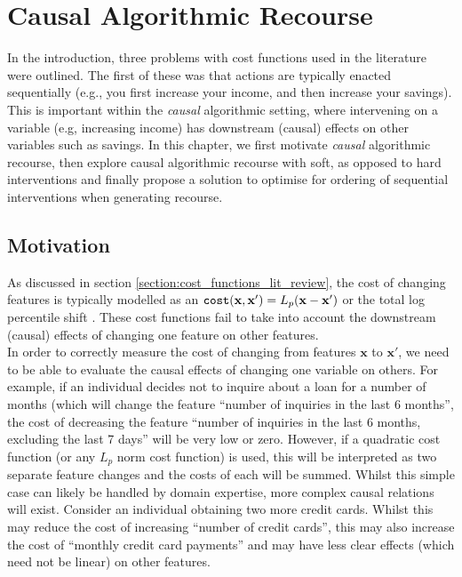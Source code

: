 \chapter{Causal Algorithmic Recourse} \label{chapter:causal_recourse}

In the introduction, three problems with cost functions used in the literature were outlined. The first of these was that actions are typically enacted sequentially (e.g., you first increase your income, and then increase your savings). This is important within the \textit{causal} algorithmic setting, where intervening on a variable (e.g, increasing income) has downstream (causal) effects on other variables such as savings. In this chapter, we first motivate \textit{causal} algorithmic recourse, then explore causal algorithmic recourse with soft, as opposed to hard interventions and finally propose a solution to optimise for ordering of sequential interventions when generating recourse.

\section{Motivation} \label{section:causal_recourse_motivation}

As discussed in section \ref{section:cost_functions_lit_review}, the cost of changing features is typically modelled as an $\operatorname*{\texttt{cost}}(\mathbf{x,x}')=L_p(\mathbf{x} - \mathbf{x}')$ or the total log percentile shift \citep{ustunActionableRecourseLinear2019}. These cost functions fail to take into account the downstream (causal) effects of changing one feature on other features.\\

In order to correctly measure the cost of changing from features $\mathbf{x}$ to $\mathbf{x}'$, we need to be able to evaluate the causal effects of changing one variable on others. For example, if an individual decides not to inquire about a loan for a number of months (which will change the feature ``number of inquiries in the last 6 months'', the cost of decreasing the feature ``number of inquiries in the last 6 months, excluding the last 7 days'' will be very low or zero. However, if a quadratic cost function (or any $L_p$ norm cost function) is used, this will be interpreted as two separate feature changes and the costs of each will be summed. Whilst this simple case can likely be handled by domain expertise, more complex causal relations will exist. Consider an individual obtaining two more credit cards. Whilst this may reduce the cost of increasing ``number of credit cards'', this may also increase the cost of ``monthly credit card payments'' and may have less clear effects (which need not be linear) on other features.\\

